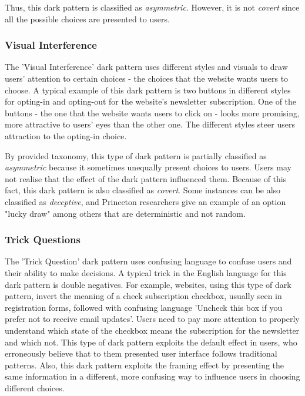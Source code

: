         Thus, this dark pattern is classified as \emph{asymmetric}. However, it is not \emph{covert} since all the possible choices are presented to users.

        \subsubsection{Visual Interference}
        The 'Visual Interference' dark pattern uses different styles and visuals to draw users' attention to certain choices - the choices that the website wants users to choose. A typical example of this dark pattern is two buttons in different styles for opting-in and opting-out for the website's newsletter subscription. One of the buttons - the one that the website wants users to click on - looks more promising, more attractive to users' eyes than the other one. The different styles steer users attraction to the opting-in choice. 
        
        By provided taxonomy, this type of dark pattern is partially classified as \emph{asymmetric} because it sometimes unequally present choices to users. Users may not realise that the effect of the dark pattern influenced them. Because of this fact, this dark pattern is also classified as \emph{covert}. Some instances can be also classified as \emph{deceptive}, and Princeton researchers give an example of an option "lucky draw" among others that are deterministic and not random.

        \subsubsection{Trick Questions}
        The 'Trick Question' dark pattern uses confusing language to confuse users and their ability to make decisions. A typical trick in the English language for this dark pattern is double negatives. For example, websites, using this type of dark pattern, invert the meaning of a check subscription checkbox, usually seen in registration forms, followed with confusing language 'Uncheck this box if you prefer not to receive email updates'. Users need to pay more attention to properly understand which state of the checkbox means the subscription for the newsletter and which not. This type of dark pattern exploits the default effect in users, who erroneously believe that to them presented user interface follows traditional patterns. Also, this dark pattern exploits the framing effect by presenting the same information in a different, more confusing way to influence users in choosing different choices. 
        

